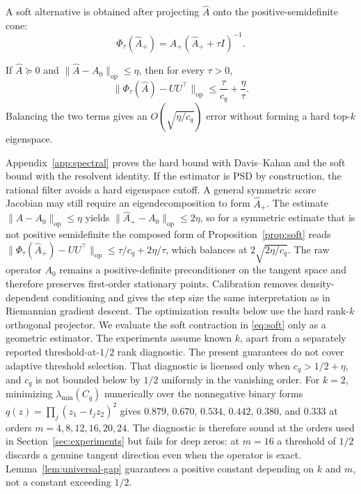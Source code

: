 \documentclass[10pt]{article}
\theoremstyle{c2fup}
\newcommand{\op}{\mathrm{op}}
\begin{document}
A soft alternative is obtained after projecting $\widehat A$ onto the positive-semidefinite cone:
\begin{equation}
  \Phi_\tau(\widehat A_+)=\widehat A_+(\widehat A_++\tau I)^{-1}.
  \label{eq:soft}
\end{equation}

\begin{proposition}
\label{prop:soft}
If $\widehat A\succeq0$ and $\|\widehat A-A_0\|_\op\le\eta$, then for every $\tau>0$,
\begin{equation}
  \|\Phi_\tau(\widehat A)-UU^\top\|_\op
  \le \frac{\tau}{c_q}+\frac{\eta}{\tau}.
  \label{eq:soft-bound}
\end{equation}
Balancing the two terms gives an $O(\sqrt{\eta/c_q})$ error without forming a hard top-$k$ eigenspace.
\end{proposition}

Appendix~\ref{app:spectral} proves the hard bound with Davis--Kahan and the soft bound with the resolvent identity.  If the estimator is PSD by construction, the rational filter avoids a hard eigenspace cutoff.  A general symmetric score Jacobian may still require an eigendecomposition to form $\widehat A_+$.  The estimate $\|\widehat A-A_0\|_\op\le\eta$ yields $\|\widehat A_+-A_0\|_\op\le2\eta$, so for a symmetric estimate that is not positive semidefinite the composed form of Proposition~\ref{prop:soft} reads $\|\Phi_\tau(\widehat A_+)-UU^\top\|_\op\le\tau/c_q+2\eta/\tau$, which balances at $2\sqrt{2\eta/c_q}$.  The raw operator $A_0$ remains a positive-definite preconditioner on the tangent space and therefore preserves first-order stationary points.  Calibration removes density-dependent conditioning and gives the step size the same interpretation as in Riemannian gradient descent.  The optimization results below use the hard rank-$k$ orthogonal projector.  We evaluate the soft contraction in \eqref{eq:soft} only as a geometric estimator.  The experiments assume known $k$, apart from a separately reported threshold-at-$1/2$ rank diagnostic.  The present guarantees do not cover adaptive threshold selection.  That diagnostic is licensed only when $c_q>1/2+\eta$, and $c_q$ is not bounded below by $1/2$ uniformly in the vanishing order.  For $k=2$, minimizing $\lambda_{\min}(C_q)$ numerically over the nonnegative binary forms $q(z)=\prod_j(z_1-t_jz_2)^2$ gives $0.879$, $0.670$, $0.534$, $0.442$, $0.380$, and $0.333$ at orders $m=4,8,12,16,20,24$.  The diagnostic is therefore sound at the orders used in Section~\ref{sec:experiments} but fails for deep zeros: at $m=16$ a threshold of $1/2$ discards a genuine tangent direction even when the operator is exact.  Lemma~\ref{lem:universal-gap} guarantees a positive constant depending on $k$ and $m$, not a constant exceeding $1/2$.
\end{document}
